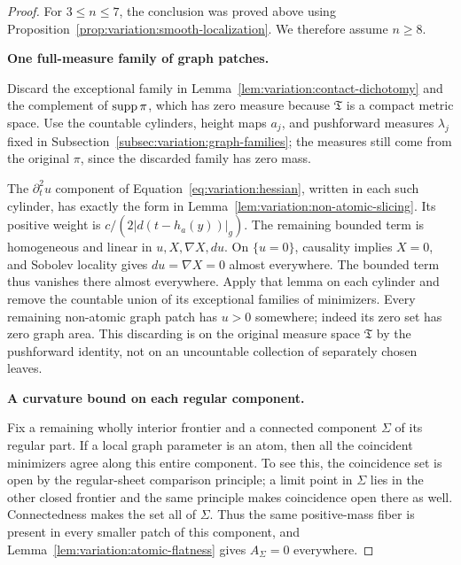 \begin{proof}
For $3\leq n\leq7$, the conclusion was proved above using
Proposition~\ref{prop:variation:smooth-localization}. We therefore assume
$n\geq8$.

\smallskip\noindent\textbf{One full-measure family of graph patches.}

Discard the exceptional family in
Lemma~\ref{lem:variation:contact-dichotomy} and the complement of
$\operatorname{supp}\pi$, which has zero measure because $\mathfrak T$ is a compact
metric space. Use the countable cylinders, height maps $a_j$, and
pushforward measures $\lambda_j$ fixed in
Subsection~\ref{subsec:variation:graph-families}; the measures still
come from the original $\pi$, since the discarded family has zero mass.

The $\partial_t^2u$ component of
Equation~\eqref{eq:variation:hessian}, written in each such cylinder, has exactly
the form in Lemma~\ref{lem:variation:non-atomic-slicing}.
Its positive weight is $c/(2|d(t-h_a(y))|_g)$.
The remaining bounded term is homogeneous and linear in
$u,X,\nabla X,du$.  On $\{u=0\}$, causality implies $X=0$, and
Sobolev locality gives $du=\nabla X=0$ almost everywhere.  The bounded
term thus vanishes there almost everywhere.  Apply that lemma on
each cylinder and remove the countable union of its exceptional
families of minimizers.  Every remaining non-atomic graph patch
has $u>0$ somewhere; indeed its zero set has zero graph area.
This discarding is on the original measure space $\mathfrak T$ by
the pushforward identity, not on an uncountable collection of
separately chosen leaves.

\smallskip\noindent\textbf{A curvature bound on each regular component.}

Fix a remaining wholly interior frontier and a connected component
$\Sigma$ of its regular part.  If a local graph parameter is an atom,
then all the coincident minimizers agree along this entire component.
To see this, the coincidence set is open by the regular-sheet
comparison principle; a limit point in $\Sigma$ lies in the other
closed frontier and the same principle makes coincidence open
there as well.  Connectedness makes the set all of $\Sigma$.
Thus the same positive-mass fiber is present in every smaller
patch of this component, and Lemma~\ref{lem:variation:atomic-flatness}
gives $A_\Sigma=0$ everywhere.


\end{proof}
